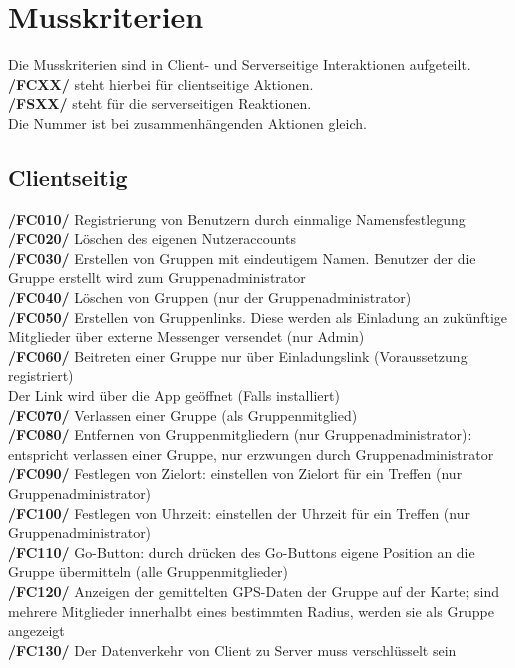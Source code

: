 \newpage
\section{Musskriterien}
Die Musskriterien sind in Client- und Serverseitige Interaktionen aufgeteilt.\\
\textbf{/FCXX/} steht hierbei für clientseitige Aktionen.\\
\textbf{/FSXX/} steht für die serverseitigen Reaktionen.\\
Die Nummer ist bei zusammenhängenden Aktionen gleich.\\
\subsection{Clientseitig}
     \textbf{/FC010/} Registrierung von Benutzern durch einmalige Namensfestlegung\\
     \textbf{/FC020/} Löschen des eigenen Nutzeraccounts\\
     \textbf{/FC030/} Erstellen von Gruppen mit eindeutigem Namen. Benutzer der die Gruppe erstellt wird zum Gruppenadministrator\\
     \textbf{/FC040/} Löschen von Gruppen (nur der Gruppenadministrator)   \\
     \textbf{/FC050/} Erstellen von Gruppenlinks. Diese werden als Einladung an zukünftige Mitglieder über externe Messenger versendet (nur Admin)\\
     \textbf{/FC060/} Beitreten einer Gruppe nur über Einladungslink (Voraussetzung registriert) \\
     Der Link wird über die App geöffnet (Falls installiert) \\
     \textbf{/FC070/} Verlassen einer Gruppe (als Gruppenmitglied)\\
     \textbf{/FC080/} Entfernen von Gruppenmitgliedern (nur Gruppenadministrator): entspricht verlassen einer Gruppe, nur erzwungen durch Gruppenadministrator\\
     \textbf{/FC090/} Festlegen von Zielort: einstellen von Zielort für ein Treffen (nur Gruppenadministrator)\\
     \textbf{/FC100/} Festlegen von Uhrzeit: einstellen der Uhrzeit für ein Treffen (nur Gruppenadministrator) \\
     \textbf{/FC110/} Go-Button: durch drücken des Go-Buttons eigene Position an die Gruppe übermitteln (alle Gruppenmitglieder)\\
     \textbf{/FC120/} Anzeigen der gemittelten GPS-Daten der Gruppe auf der Karte; sind mehrere Mitglieder innerhalbt eines bestimmten Radius,
     werden sie als Gruppe angezeigt\\
     \textbf{/FC130/} Der Datenverkehr von Client zu Server muss verschlüsselt sein\\
